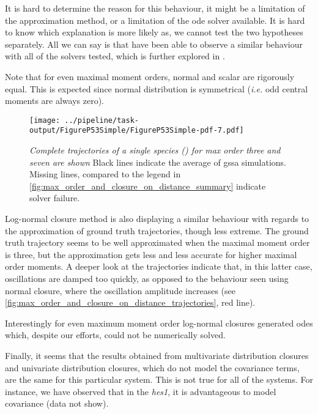 It is hard to determine the reason for this behaviour, it might be a limitation of the approximation method, or a limitation of the \gls{ode} solver available. It is hard to know which explanation is more likely as, we cannot test the two hypotheses separately. All we can say is that have been able to observe a similar behaviour with all of the solvers tested, which is further explored in .

Note that for even maximal moment orders, normal and scalar are rigorously equal.
This is expected since normal distribution is symmetrical (\emph{i.e.} odd central moments are always zero).

\begin{figure}
    \centering
    \texttt{[image: ../pipeline/task-output/FigureP53Simple/FigureP53Simple-pdf-7.pdf]}
    \caption{\emph{Complete trajectories of a single species (\pft) for max order three and seven are shown} Black lines indicate the average of \gls{gssa} simulations. Missing lines, compared to the legend in \autoref{fig:max_order_and_closure_on_distance_summary} indicate solver failure.}
    \label{fig:max_order_and_closure_on_distance_trajectories}
\end{figure}

Log-normal closure method is also displaying a similar behaviour with regards to the approximation of ground truth trajectories, though less extreme. 
The ground truth trajectory seems to be well approximated when the maximal moment order is three, but the approximation gets less and less accurate for higher maximal order moments.
A deeper look at the trajectories indicate that, in this latter case,
oscillations are damped too quickly, as opposed to the behaviour seen using normal closure, where the oscillation amplitude increases (see \autoref{fig:max_order_and_closure_on_distance_trajectories}, red line).

 Interestingly for even maximum moment order log-normal closures generated \gls{ode}s which,
despite our efforts, could not be numerically solved.

Finally, it seems that the results obtained from multivariate distribution closures and  univariate distribution closures, which do not model the covariance terms, are the same for this particular system. 
This is not true for all of the systems. For instance, we have observed that in the \emph{hes1}, it is advantageous to model covariance (data not show).

